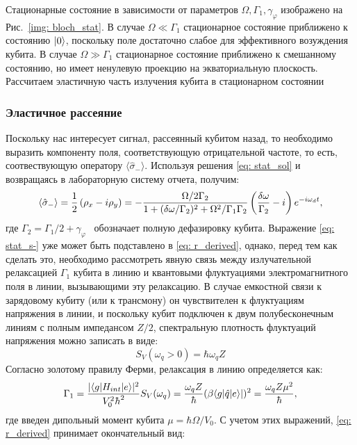 Стационарные состояние в зависимости от параметров $\Omega, \Gamma_1, \gamma_\varphi$ изображено на Рис.~\ref{img: bloch_stat}. В случае $\Omega\!\ll\!\Gamma_1$ стационарное состояние приближено к состоянию $\ket{0}$, поскольку поле достаточно слабое для эффективного возуждения кубита. В случае $\Omega\!\gg\!\Gamma_1$ стационарное состояние приближено к смешанному состоянию, но имеет ненулевую проекцию на экваториальную плоскость. Рассчитаем эластичную часть излучения кубита в стационарном состоянии
\subsubsection{Эластичное рассеяние}
Поскольку нас интересует сигнал, рассеянный кубитом назад, то необходимо выразить компоненту поля, соответствующую отрицательной частоте, то есть, соотвествующую оператору $\langle\hat{\sigma}_- \rangle$. Используя решения \eqref{eq: stat_sol} и возвращаясь в лабораторную систему отчета, получим:
\begin{equation}
\braket{\hat{\sigma}_-} = \frac{1}{2}\left(\rho_x-i\rho_y\right) = -\frac{\Omega/2\Gamma_2}{1+(\delta\omega/\Gamma_2)^2+\Omega^2/\Gamma_1\Gamma_2}\left(\frac{\delta\omega}{\Gamma_2}-i\right)e^{-i\omega_d t},
\label{eq: stat_s-}
\end{equation} 
где $\Gamma_2 = \Gamma_1/2
 + \gamma_\varphi$~ обозначает полную дефазировку кубита. Выражение \eqref{eq: stat_s-} уже может быть подставлено в \eqref{eq: r_derived}, однако, перед тем как сделать это, необходимо рассмотреть явную связь между излучательной релаксацией $\Gamma_1$ кубита в линию и квантовыми флуктуациями электромагнитного поля в линии, вызывающими эту релаксацию. В случае емкостной связи к зарядовому кубиту (или к трансмону) он чувствителен к флуктуациям напряжения в линии, и поскольку кубит подключен к двум полубесконечным линиям с полным импедансом $Z/2$, спектральную плотность флуктуаций напряжения можно записать в виде:
\begin{equation}
S_{V}(\omega_q>0)=\hbar \omega_q Z
\end{equation}
Согласно золотому правилу Ферми, релаксация в линию определяется \cite{nazarov2002quantum} как:
\begin{equation}\label{eq: G1}
\Gamma_1 = \frac{|\!\braket{g|H_{int}|e}\!|^2}{V_0^2\hbar^2}S_V(\omega_q) = \frac{\omega_q Z}{\hbar}(\beta \langle{g|\hat{q}|e}\rangle|)^2 = \frac{\omega_q Z \mu^2}{\hbar}, 
\end{equation}
где введен дипольный момент кубита $\mu=\hbar\Omega/V_0$.
С учетом этих выражений, \eqref{eq: r_derived} принимает окончательный вид:
